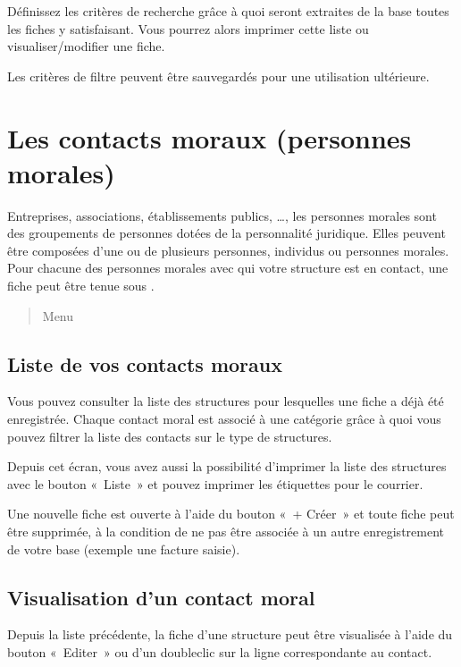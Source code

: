 \documentclass[a4paper,10pt,oneside,french]{sphinxmanual}
\begin{document}
Définissez les critères de recherche grâce à quoi seront extraites de la base toutes les fiches y satisfaisant.
Vous pourrez alors imprimer cette liste ou visualiser/modifier une fiche.

\noindent{}

Les critères de filtre peuvent être sauvegardés pour une utilisation ultérieure.


\section{Les contacts moraux (personnes morales)}
\label{\detokenize{contacts/legal_entity:les-contacts-moraux-personnes-morales}}\label{\detokenize{contacts/legal_entity::doc}}
Entreprises, associations, établissements publics, …, les personnes morales sont des groupements de personnes dotées de la personnalité juridique. Elles peuvent être composées d’une ou de plusieurs personnes, individus ou personnes morales.
Pour chacune des personnes morales avec qui votre structure est en contact, une fiche peut être tenue sous .
\begin{quote}

Menu 
\end{quote}


\subsection{Liste de vos contacts moraux}
\label{\detokenize{contacts/legal_entity:liste-de-vos-contacts-moraux}}
Vous pouvez consulter la liste des structures pour lesquelles une fiche a déjà été enregistrée.
Chaque contact moral est associé à une catégorie grâce à quoi vous pouvez filtrer la liste des contacts sur le type de structures.

\noindent{}

Depuis cet écran, vous avez aussi la possibilité d’imprimer la liste des structures avec le bouton « Liste » et pouvez imprimer les étiquettes pour le courrier.

Une nouvelle fiche est ouverte à l’aide du bouton « + Créer » et toute fiche peut être supprimée, à la condition de ne pas être associée à un autre enregistrement de votre base (exemple une facture saisie).


\subsection{Visualisation d’un contact moral}
\label{\detokenize{contacts/legal_entity:visualisation-d-un-contact-moral}}
Depuis la liste précédente, la fiche d’une structure peut être visualisée à l’aide du bouton « Editer » ou d’un double\sphinxhyphen{}clic sur la ligne correspondante au contact.
\end{document}

